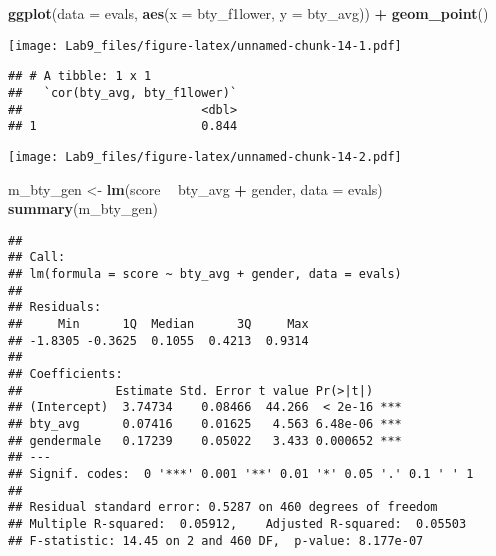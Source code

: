 \documentclass[
]{article}
\newenvironment{Shaded}{\begin{snugshade}}{\end{snugshade}}
\newcommand{\DataTypeTok}[1]{\textcolor[rgb]{0.13,0.29,0.53}{#1}}
\newcommand{\KeywordTok}[1]{\textcolor[rgb]{0.13,0.29,0.53}{\textbf{#1}}}
\newcommand{\NormalTok}[1]{#1}
\newcommand{\OperatorTok}[1]{\textcolor[rgb]{0.81,0.36,0.00}{\textbf{#1}}}
\newcommand{\StringTok}[1]{\textcolor[rgb]{0.31,0.60,0.02}{#1}}
\begin{document}
\begin{Shaded}
\begin{Highlighting}[]
\KeywordTok{ggplot}\NormalTok{(}\DataTypeTok{data =}\NormalTok{ evals, }\KeywordTok{aes}\NormalTok{(}\DataTypeTok{x =}\NormalTok{ bty_f1lower, }\DataTypeTok{y =}\NormalTok{ bty_avg)) }\OperatorTok{+}
\StringTok{  }\KeywordTok{geom_point}\NormalTok{()}
\end{Highlighting}
\end{Shaded}

\texttt{[image: Lab9\_files/figure-latex/unnamed-chunk-14-1.pdf]}

\begin{Shaded}
\end{Shaded}

\begin{verbatim}
## # A tibble: 1 x 1
##   `cor(bty_avg, bty_f1lower)`
##                         <dbl>
## 1                       0.844
\end{verbatim}

\begin{Shaded}
\end{Shaded}

\texttt{[image: Lab9\_files/figure-latex/unnamed-chunk-14-2.pdf]}

\begin{Shaded}
\begin{Highlighting}[]
\NormalTok{m_bty_gen <-}\StringTok{ }\KeywordTok{lm}\NormalTok{(score }\OperatorTok{~}\StringTok{ }\NormalTok{bty_avg }\OperatorTok{+}\StringTok{ }\NormalTok{gender, }\DataTypeTok{data =}\NormalTok{ evals)}
\KeywordTok{summary}\NormalTok{(m_bty_gen)}
\end{Highlighting}
\end{Shaded}

\begin{verbatim}
## 
## Call:
## lm(formula = score ~ bty_avg + gender, data = evals)
## 
## Residuals:
##     Min      1Q  Median      3Q     Max 
## -1.8305 -0.3625  0.1055  0.4213  0.9314 
## 
## Coefficients:
##             Estimate Std. Error t value Pr(>|t|)    
## (Intercept)  3.74734    0.08466  44.266  < 2e-16 ***
## bty_avg      0.07416    0.01625   4.563 6.48e-06 ***
## gendermale   0.17239    0.05022   3.433 0.000652 ***
## ---
## Signif. codes:  0 '***' 0.001 '**' 0.01 '*' 0.05 '.' 0.1 ' ' 1
## 
## Residual standard error: 0.5287 on 460 degrees of freedom
## Multiple R-squared:  0.05912,    Adjusted R-squared:  0.05503 
## F-statistic: 14.45 on 2 and 460 DF,  p-value: 8.177e-07
\end{verbatim}
\end{document}
